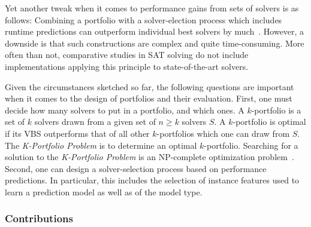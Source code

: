 \documentclass[conference]{IEEEtran}
\begin{document}
Yet another tweak when it comes to performance gains from sets of solvers is as follows:
Combining a portfolio with a solver-election process which includes runtime predictions can outperform individual best solvers by much~\cite{xu2008satzilla}. 
However, a downside is that such constructions are complex and quite time-consuming. 
More often than not, comparative studies in SAT solving do not include implementations applying this principle to state-of-the-art solvers.

Given the circumstances sketched so far, the following questions are important when it comes to the design of portfolios and their evaluation. 
First, one must decide how many solvers to put in a portfolio, and which ones. 
A $k$-portfolio is a set of $k$ solvers drawn from a given set of $n \geq k$ solvers $S$. 
A $k$-portfolio is optimal if its VBS outperforms that of all other $k$-portfolios which one can draw from $S$. 
The \emph{K-Portfolio Problem} is to determine an optimal $k$-portfolio. 
Searching for a solution to the \emph{K-Portfolio Problem} is an NP-complete optimization problem~\cite{nof2020real}. 
Second, one can design a solver-selection process based on performance predictions. 
In particular, this includes the selection of instance features used to learn a prediction model as well as of the model type. 

\subsubsection{Contributions}
\end{document}
